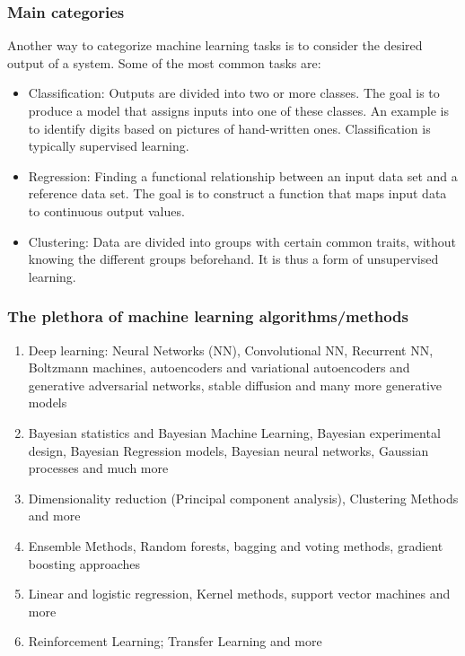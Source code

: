 \documentclass{beamer}
\begin{document}
\begin{frame}
\frametitle{Main categories}

\begin{block}{}
Another way to categorize machine learning tasks is to consider the desired output of a system.
Some of the most common tasks are:

\begin{itemize}
\item Classification: Outputs are divided into two or more classes. The goal is to   produce a model that assigns inputs into one of these classes. An example is to identify  digits based on pictures of hand-written ones. Classification is typically supervised learning.

\item Regression: Finding a functional relationship between an input data set and a reference data set.   The goal is to construct a function that maps input data to continuous output values.

\item Clustering: Data are divided into groups with certain common traits, without knowing the different groups beforehand.  It is thus a form of unsupervised learning.
\end{itemize}

\noindent
\end{block}
\end{frame}

\begin{frame}
\frametitle{The plethora  of machine learning algorithms/methods}

\begin{enumerate}
\item Deep learning: Neural Networks (NN), Convolutional NN, Recurrent NN, Boltzmann machines, autoencoders and variational autoencoders  and generative adversarial networks, stable diffusion and many more generative models

\item Bayesian statistics and Bayesian Machine Learning, Bayesian experimental design, Bayesian Regression models, Bayesian neural networks, Gaussian processes and much more

\item Dimensionality reduction (Principal component analysis), Clustering Methods and more

\item Ensemble Methods, Random forests, bagging and voting methods, gradient boosting approaches 

\item Linear and logistic regression, Kernel methods, support vector machines and more

\item Reinforcement Learning; Transfer Learning and more 
\end{enumerate}

\noindent
\end{frame}
\end{document}
